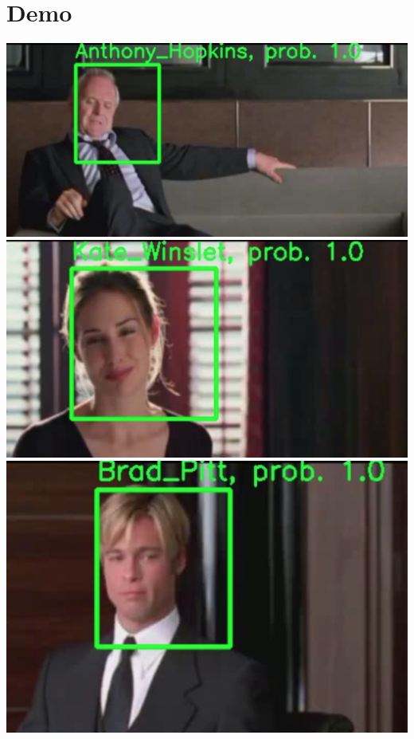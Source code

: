 \documentclass{article}
\begin{document}
\section{Demo}
\includegraphics[scale=0.2]{images/demo1.png}  \\
\includegraphics[scale=0.2]{images/demo2.png}\\  
\includegraphics[scale=0.2]{images/demo3.png}  \\
\end{document}
